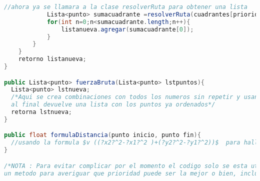 \begin{lstlisting}[language=JAVA, caption=Pseudocodigo del Rectangulo aureo, label=lst:codigo10]
			//ahora ya se llamara a la clase resolverRuta para obtener una lista
			Lista<punto> sumacuadrante =resolverRuta(cuadrantes[prioridad[l]],origencuadrante;prioridad));
			for(int n=0;n<sumacuadrante.length;n++){
				listanueva.agregar(sumacuadrante[0]);
			}
		}
	}
	retorno listanueva;
}

public Lista<punto> fuerzaBruta(Lista<punto> lstpuntos){
  Lista<punto> lstnueva;
  /*Aqui se crea combinaciones con todos los numeros sin repetir y usando todos con el fin de determinar en que orden es mas optimo, 
  al final devuelve una lista con los puntos ya ordenados*/
  retorna lstnueva;
}

public float formulaDistancia(punto inicio, punto fin){
  //usando la formula $v ((?x2?^2-?x1?^2 )+(?y2?^2-?y1?^2))$  para hallar la distancia.
}

/*NOTA : Para evitar complicar por el momento el codigo solo se esta utilizando un arreglo de prioridad, se tiene contemplando 
un metodo para averiguar que prioridad puede ser la mejor o bien, incluso usar un metodo de fuerza bruta solo que en ves de agrupar puntos serian listas*/ 

    \end{lstlisting}